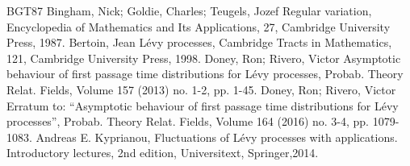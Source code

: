 
\begin{thebibliography}{BGT87}
 Bingham, Nick; Goldie, Charles; Teugels, Jozef Regular variation, Encyclopedia of Mathematics and Its Applications, 27, Cambridge University Press, 1987.
 Bertoin, Jean Lévy processes, Cambridge Tracts in Mathematics, 121, Cambridge University Press, 1998.
 Doney, Ron; Rivero, Victor Asymptotic behaviour of first passage time distributions for Lévy processes, Probab. Theory Relat. Fields, Volume 157 (2013) no. 1-2, pp. 1-45.
 Doney, Ron; Rivero, Victor Erratum to: “Asymptotic behaviour of first passage time distributions for Lévy processes”, Probab. Theory Relat. Fields, Volume 164 (2016) no. 3-4, pp. 1079-1083.
 Andreas E. Kyprianou, Fluctuations of Lévy processes with applications. Introductory lectures, 2nd edition, Universitext, Springer,2014.
\end{thebibliography}
